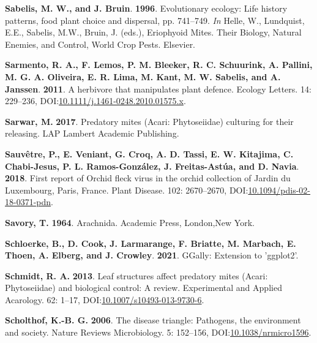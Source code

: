 \documentclass[12pt,final,CPage]{ufthesis}
\newlength{\cslhangindent}
\newenvironment{CSLReferences}[2] %
{%
	\setlength{\parindent}{0pt}
	\ifodd #1 \everypar{\setlength{\hangindent}{\cslhangindent}}\ignorespaces\fi
	\ifnum #2 > 0
	\setlength{\parskip}{#2\baselineskip}
	\fi
}%
{}
\begin{document}
{\begin{CSLReferences}{1}{0}
  \leavevmode{}%
  \textbf{Sabelis, M. W., and J. Bruin}. \textbf{1996}. Evolutionary ecology: Life history patterns, food plant choice and dispersal, pp. 741--749. \emph{In} Helle, W., Lundquist, E.E., Sabelis, M.W., Bruin, J. (eds.), Eriophyoid Mites. Their Biology, Natural Enemies, and Control, World Crop Pests. Elsevier.

  \leavevmode{}%
  \textbf{Sarmento, R. A., F. Lemos, P. M. Bleeker, R. C. Schuurink, A. Pallini, M. G. A. Oliveira, E. R. Lima, M. Kant, M. W. Sabelis, and A. Janssen}. \textbf{2011}. A herbivore that manipulates plant defence. Ecology Letters. 14: 229--236, DOI:\href{https://doi.org/10.1111/j.1461-0248.2010.01575.x}{10.1111/j.1461-0248.2010.01575.x}.

  \leavevmode{}%
  \textbf{Sarwar, M.} \textbf{2017}. Predatory mites ({Acari}: {Phytoseiidae}) culturing for their releasing. LAP Lambert Academic Publishing.

  \leavevmode{}%
  \textbf{Sauvêtre, P., E. Veniant, G. Croq, A. D. Tassi, E. W. Kitajima, C. Chabi-Jesus, P. L. Ramos-González, J. Freitas-Astúa, and D. Navia}. \textbf{2018}. First report of {Orchid fleck virus} in the orchid collection of {Jardin du Luxembourg}, {Paris, France}. Plant Disease. 102: 2670--2670, DOI:\href{https://doi.org/10.1094/pdis-02-18-0371-pdn}{10.1094/pdis-02-18-0371-pdn}.

  \leavevmode{}%
  \textbf{Savory, T.} \textbf{1964}. Arachnida. Academic Press, London,New York.

  \leavevmode{}%
  \textbf{Schloerke, B., D. Cook, J. Larmarange, F. Briatte, M. Marbach, E. Thoen, A. Elberg, and J. Crowley}. \textbf{2021}. {GGally}: Extension to 'ggplot2'.

  \leavevmode{}%
  \textbf{Schmidt, R. A.} \textbf{2013}. Leaf structures affect predatory mites ({Acari}: {Phytoseiidae}) and biological control: A review. Experimental and Applied Acarology. 62: 1--17, DOI:\href{https://doi.org/10.1007/s10493-013-9730-6}{10.1007/s10493-013-9730-6}.

  \leavevmode{}%
  \textbf{Scholthof, K.-B. G.} \textbf{2006}. The disease triangle: Pathogens, the environment and society. Nature Reviews Microbiology. 5: 152--156, DOI:\href{https://doi.org/10.1038/nrmicro1596}{10.1038/nrmicro1596}.


\end{CSLReferences}}
\end{document}
